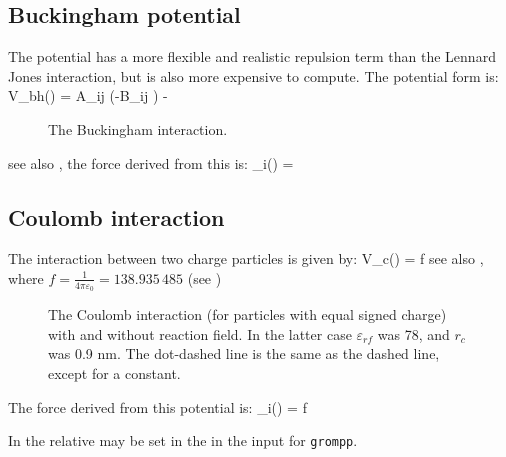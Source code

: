 \subsection{Buckingham potential}
The  
potential has a more flexible and realistic repulsion term
than the Lennard Jones interaction, but is also more expensive to
compute. The potential form is:
\beq
V_{bh}(\rij) = A_{ij} \exp(-B_{ij} \rij) -
\eeq
\begin{figure}
\centerline{}
\caption {The Buckingham interaction.}
\label{fig:bham}
\end{figure}

see also , the force derived from this is:
\beq
 _i(\rij) =  \rnorm
\eeq

\subsection{Coulomb interaction}
\label{sec:coul}
\newcommand{\epsr}{\varepsilon_r}
\newcommand{\epsrf}{\varepsilon_{rf}}
The  interaction between two charge particles is given by:
\beq
V_c(\rij) = f \frac{q_i q_j}{\epsr \rij}
\label{eqn:vcoul}
\eeq
see also , where $f = \frac{1}{4\pi \varepsilon_0} =
138.935\,485$ (see )

\begin{figure}
\centerline{}
\caption[The Coulomb interaction with and without reaction field.]{The
Coulomb interaction (for particles with equal signed charge) with and
without reaction field. In the latter case $\epsrf$ was 78, and $r_c$
was 0.9 nm. The dot-dashed line is the same as the dashed line, except
for a constant.}
\label{fig:coul}
\end{figure}

The force derived from this potential is:
\beq
{}_i(\rvij) = f \frac{q_i q_j}{\epsr\rij^2}\rnorm
\eeq

In {\gromacs} the  relative  
\normindex{$\epsr$}
may be set in the in the input for {\tt grompp}. 

